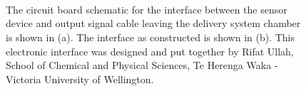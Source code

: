 \documentclass[
  a4paper,
]{scrbook}
\begin{document}
\begin{figure}
\begin{minipage}[t]{0.03\linewidth}
{\centering 

~

}

\end{minipage}%
\newline
\begin{minipage}[t]{0.03\linewidth}

{\centering 


}

\end{minipage}%
%
\begin{minipage}[t]{0.03\linewidth}

{\centering 

~

}

\end{minipage}%
%
\begin{minipage}[t]{0.91\linewidth}

{\centering 


}

\end{minipage}%
%
\begin{minipage}[t]{0.03\linewidth}

{\centering 

~

}

\end{minipage}%

\caption{\label{fig-device-interface}The circuit board schematic for the
interface between the sensor device and output signal cable leaving the
delivery system chamber is shown in (a). The interface as constructed is
shown in (b). This electronic interface was designed and put together by
Rifat Ullah, School of Chemical and Physical Sciences, Te Herenga Waka -
Victoria University of Wellington.}

\end{figure}
\end{document}
